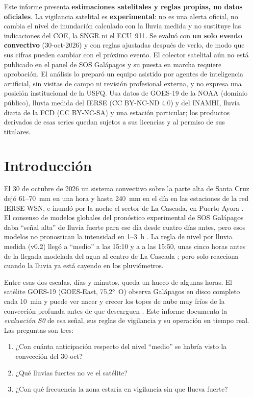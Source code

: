 \documentclass{sosg-informe}
\begin{document}
\begin{aviso}
Este informe presenta \textbf{estimaciones satelitales y reglas propias, no datos oficiales}. La vigilancia satelital es \textbf{experimental}: no es una alerta oficial, no cambia el nivel de inundación calculado con la lluvia medida y no sustituye las indicaciones del COE, la SNGR ni el ECU~911. Se evaluó con \textbf{un solo evento convectivo} (30-oct-2026) y con reglas ajustadas después de verlo, de modo que sus cifras pueden cambiar con el próximo evento. El colector satelital aún no está publicado en el panel de SOS Galápagos y su puesta en marcha requiere aprobación. El análisis lo preparó un equipo asistido por agentes de inteligencia artificial, sin visitas de campo ni revisión profesional externa, y no expresa una posición institucional de la USFQ. Usa datos de GOES-19 de la NOAA (dominio público), lluvia medida del IERSE (CC BY-NC-ND 4.0) y del INAMHI, lluvia diaria de la FCD (CC BY-NC-SA) y una estación particular; los productos derivados de esas series quedan sujetos a sus licencias y al permiso de sus titulares.
\end{aviso}

\section{Introducción}

El 30 de octubre de 2026 un sistema convectivo sobre la parte alta de Santa Cruz dejó 61--70~mm en una hora y hasta 240~mm en el día en las estaciones de la red IERSE-WSN, e inundó por la noche el sector de La Cascada, en Puerto Ayora \citep{sosg202602}. El consenso de modelos globales del pronóstico experimental de SOS Galápagos daba \enquote{señal alta} de lluvia fuerte para ese día desde cuatro días antes, pero esos modelos no pronostican la intensidad en 1--3~h \citep{sosg202608}. La regla de nivel por lluvia medida (v0.2) llegó a \enquote{medio} a las 15:10 y a \alto{} a las 15:50, unas cinco horas antes de la llegada modelada del agua al centro de La Cascada \citep{sosg202607,sosg202602}; pero solo reacciona cuando la lluvia ya está cayendo en los pluviómetros.

Entre esas dos escalas, días y minutos, queda un hueco de algunas horas. El satélite GOES-19 (GOES-East, 75,2°~O) observa Galápagos en disco completo cada 10~min y puede ver nacer y crecer los topes de nube muy fríos de la convección profunda antes de que descarguen \citep{schmit2017}. Este informe documenta la \emph{evaluación S0} de esa señal, sus reglas de vigilancia y su operación en tiempo real. Las preguntas son tres:
\begin{enumerate}
  \item ¿Con cuánta anticipación respecto del nivel \enquote{medio} se habría visto la convección del 30-oct?
  \item ¿Qué lluvias fuertes no ve el satélite?
  \item ¿Con qué frecuencia la zona estaría en vigilancia sin que llueva fuerte?
\end{enumerate}
\end{document}
